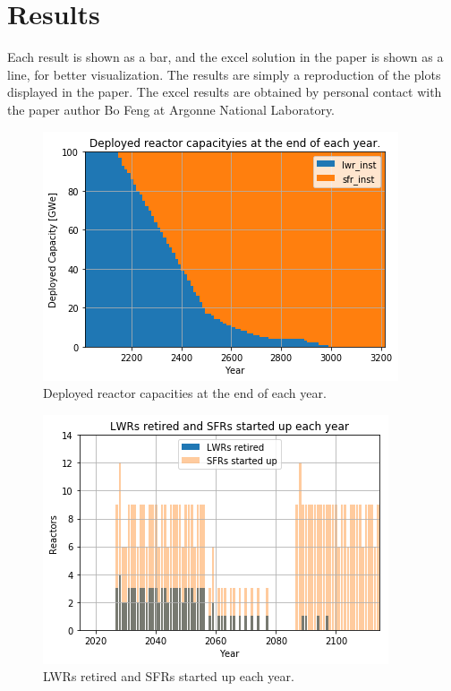 \section{Results}

Each \Cyclus result is shown as a bar, and the excel solution in the
paper is shown as a line, for better visualization. The results are
simply a reproduction of the plots displayed in the paper. The excel
results are obtained by personal contact with the paper author
Bo Feng at Argonne National Laboratory.


\begin{figure}[htbp!]
	\begin{center}
		\includegraphics[scale=0.6]{./images/results/power_plot.png}
	\end{center}
        \caption{Deployed reactor capacities at the end of each year.}
	\label{fig:pow_plot}
\end{figure}



\begin{figure}[htbp!]
	\begin{center}
		\includegraphics[scale=0.6]{./images/results/dep.png}
	\end{center}
        \caption{\glspl{LWR} retired and \glspl{SFR} started up each year.}
	\label{fig:dep}
\end{figure}

